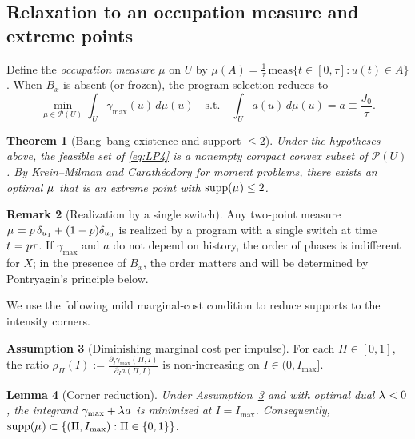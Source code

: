 \documentclass[aps,pre,twocolumn,showpacs,superscriptaddress]{revtex4-2}
\newtheorem{theorem}{Theorem}
\newtheorem{lemma}[theorem]{Lemma}
\theoremstyle{definition}
\newtheorem{assumption}[theorem]{Assumption}
\newtheorem{remark}[theorem]{Remark}
\begin{document}
\subsection{Relaxation to an occupation measure and extreme points}\label{subsec:measure4}

Define the \emph{occupation measure} $\mu$ on $U$ by $\mu(A)=\frac{1}{\tau}\,\mathrm{meas}\{t\in[0,\tau]:u(t)\in A\}$. When $B_x$ is absent (or frozen), the program selection reduces to
\begin{equation}\label{eq:LP4}
\min_{\mu\in\mathcal{P}(U)} \int_U \gamma_{\max}(u)\,d\mu(u)\quad \text{s.t.}\quad \int_U a(u)\,d\mu(u)=\bar a\equiv \frac{J_0}{\tau}.
\end{equation}

\begin{theorem}[Bang--bang existence and support $\le 2$]\label{thm:bb-existence}
Under the hypotheses above, the feasible set of \eqref{eq:LP4} is a nonempty compact convex subset of $\mathcal{P}(U)$. By Krein–Milman and Carath\'eodory for moment problems, there exists an optimal $\mu^{\*}$ that is an extreme point with $\operatorname{supp}(\mu^{\*})\le 2$.
\end{theorem}

\begin{remark}[Realization by a single switch]
Any two‑point measure $\mu^{\*}=p\,\delta_{u_1}+(1-p)\delta_{u_0}$ is realized by a program with a single switch at time $t^{\*}=p\tau$. If $\gamma_{\max}$ and $a$ do not depend on history, the order of phases is indifferent for $X$; in the presence of $B_x$, the order matters and will be determined by Pontryagin’s principle below.
\end{remark}

We use the following mild marginal‑cost condition to reduce supports to the intensity corners.

\begin{assumption}[Diminishing marginal cost per impulse]\label{ass:DMC4}
For each $\Pi\in[0,1]$, the ratio $\rho_\Pi(I):=\frac{\partial_I \gamma_{\max}(\Pi,I)}{\partial_I a(\Pi,I)}$ is non‑increasing on $I\in(0,I_{\max}]$.
\end{assumption}

\begin{lemma}[Corner reduction]\label{lem:corner4}
Under Assumption~\ref{ass:DMC4} and with optimal dual $\lambda^{\*}<0$, the integrand $\gamma_{\max}+\lambda^{\*} a$ is minimized at $I=I_{\max}$. Consequently, $\operatorname{supp}(\mu^{\*})\subset \{(\Pi,I_{\max}):\Pi\in\{0,1\}\}$.
\end{lemma}
\end{document}
